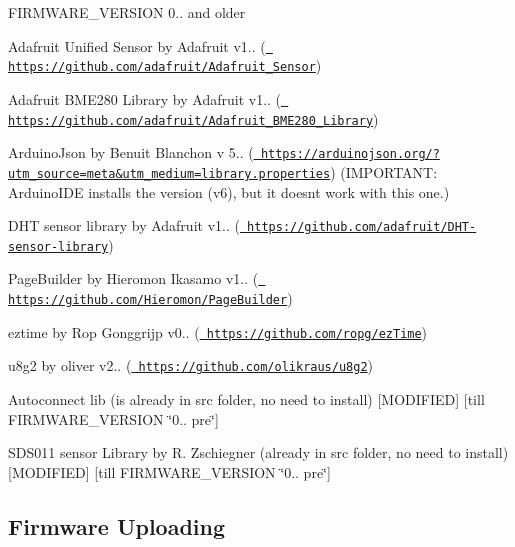 \begin{DoxyEnumerate}
\begin{DoxyItemize}
\end{DoxyItemize}
\item F\+I\+R\+M\+W\+A\+R\+E\+\_\+\+V\+E\+R\+S\+I\+ON 0.. and older
\begin{DoxyItemize}
\item Adafruit Unified Sensor by Adafruit v1.. (\href{https://github.com/adafruit/Adafruit_Sensor}{\texttt{ https\+://github.\+com/adafruit/\+Adafruit\+\_\+\+Sensor}})
\item Adafruit B\+M\+E280 Library by Adafruit v1.. (\href{https://github.com/adafruit/Adafruit_BME280_Library}{\texttt{ https\+://github.\+com/adafruit/\+Adafruit\+\_\+\+B\+M\+E280\+\_\+\+Library}})
\item Arduino\+Json by Benuit Blanchon v 5.. (\href{https://arduinojson.org/?utm_source=meta&utm_medium=library.properties}{\texttt{ https\+://arduinojson.\+org/?utm\+\_\+source=meta\&utm\+\_\+medium=library.\+properties}}) (I\+M\+P\+O\+R\+T\+A\+NT\+: Arduino\+I\+DE installs the version (v6), but it doesnt work with this one.)
\item D\+HT sensor library by Adafruit v1.. (\href{https://github.com/adafruit/DHT-sensor-library}{\texttt{ https\+://github.\+com/adafruit/\+D\+H\+T-\/sensor-\/library}})
\item Page\+Builder by Hieromon Ikasamo v1.. (\href{https://github.com/Hieromon/PageBuilder}{\texttt{ https\+://github.\+com/\+Hieromon/\+Page\+Builder}})
\item eztime by Rop Gonggrijp v0.. (\href{https://github.com/ropg/ezTime}{\texttt{ https\+://github.\+com/ropg/ez\+Time}})
\item u8g2 by oliver v2.. (\href{https://github.com/olikraus/u8g2}{\texttt{ https\+://github.\+com/olikraus/u8g2}})
\item Autoconnect lib (is already in src folder, no need to install) \mbox{[}M\+O\+D\+I\+F\+I\+ED\mbox{]} \mbox{[}till F\+I\+R\+M\+W\+A\+R\+E\+\_\+\+V\+E\+R\+S\+I\+ON \char`\"{}0.. pre\char`\"{}\mbox{]}
\item S\+D\+S011 sensor Library by R. Zschiegner (already in src folder, no need to install) \mbox{[}M\+O\+D\+I\+F\+I\+ED\mbox{]} \mbox{[}till F\+I\+R\+M\+W\+A\+R\+E\+\_\+\+V\+E\+R\+S\+I\+ON \char`\"{}0.. pre\char`\"{}\mbox{]}
\end{DoxyItemize}
\end{DoxyEnumerate}\hypertarget{index_upload}{}\subsection{Firmware Uploading}\label{index_upload}
